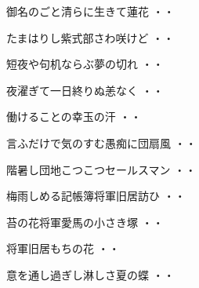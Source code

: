 \vspace{0.6cm}
\begin{shiika}御名のごと清らに生きて蓮花
\hfill{・・}\end{shiika}
\vspace{0.6cm}
\begin{shiika}たまはりし紫式部さわ咲けど
\hfill{・・}\end{shiika}
\vspace{0.6cm}
\begin{shiika}短夜や句机ならぶ夢の切れ
\hfill{・・}\end{shiika}
\vspace{0.6cm}
\begin{shiika}夜濯ぎて一日終りぬ恙なく
\hfill{・・}\end{shiika}
\vspace{0.6cm}
\begin{shiika}働けることの幸玉の汗
\hfill{・・}\end{shiika}
\vspace{0.6cm}
\begin{shiika}言ふだけで気のすむ愚痴に団扇風
\hfill{・・}\end{shiika}
\vspace{0.6cm}
\begin{shiika}階暑し団地こつこつセールスマン
\hfill{・・}\end{shiika}
\vspace{0.6cm}
\begin{shiika}梅雨しめる記帳簿将軍旧居訪ひ
\hfill{・・}\end{shiika}
\vspace{0.6cm}
\begin{shiika}苔の花将軍愛馬の小さき塚
\hfill{・・}\end{shiika}
\vspace{0.6cm}
\begin{shiika}将軍旧居もちの花
\hfill{・・}\end{shiika}
\vspace{0.6cm}
\begin{shiika}意を通し過ぎし淋しさ夏の蝶
\hfill{・・}\end{shiika}

